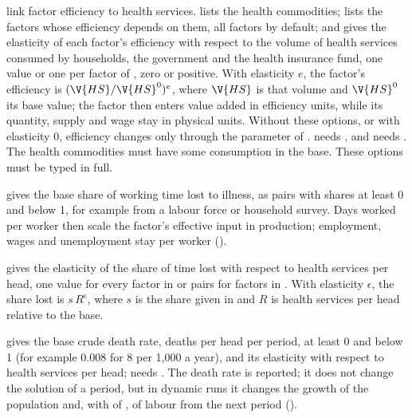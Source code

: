 \begin{optdesc}
\item[\optarg{}{healthcom}{namelist}, \optarg{}{healthfac}{namelist} and
\optarg{}{healthelas}{numlist}] link factor efficiency to health services.
 lists the health commodities;  lists the
factors whose efficiency depends on them, all factors by default; and
 gives the elasticity of each factor's efficiency with
respect to the volume of health services consumed by households, the
government and the health insurance fund, one value or one per factor of
, zero or positive. With elasticity $e$, the factor's
efficiency is $(\V{HS}/\V{HS}^0)^e$, where $\V{HS}$ is that volume and
$\V{HS}^0$ its base value; the factor then enters value added in efficiency
units, while its quantity, supply and wage stay in physical units. Without
these options, or with elasticity 0, efficiency changes only through the
parameter  of .  needs
, and  needs . The health
commodities must have some consumption in the base. These options must be
typed in full.

\item[\optarg{sickd}{ays}{spec}] gives the base share of working time lost to
illness, as \cmd{:} pairs with shares at least 0 and
below 1, for example  from a labour force or household
survey. Days worked per worker then scale the factor's effective input in
production; employment, wages and unemployment stay per worker
().

\item[\optarg{sicke}{las}{spec}] gives the elasticity of the share of time lost
with respect to health services per head, one value for every factor in
 or \cmd{:} pairs for factors in
. With elasticity $\epsilon$, the share lost is $s\,R^\epsilon$,
where $s$ is the share given in  and $R$ is health services per
head relative to the base.

\item[\optarg{mort}{ality}{\#}] gives the base crude death rate, deaths per head
per period, at least 0 and below 1 (for example 0.008 for 8 per 1,000 a year),
and  its elasticity with respect to health services per
head;  needs . The death rate is reported; it
does not change the solution of a period, but in dynamic runs it changes the
growth of the population and, with  of ,
of labour from the next period ().
\end{optdesc}

